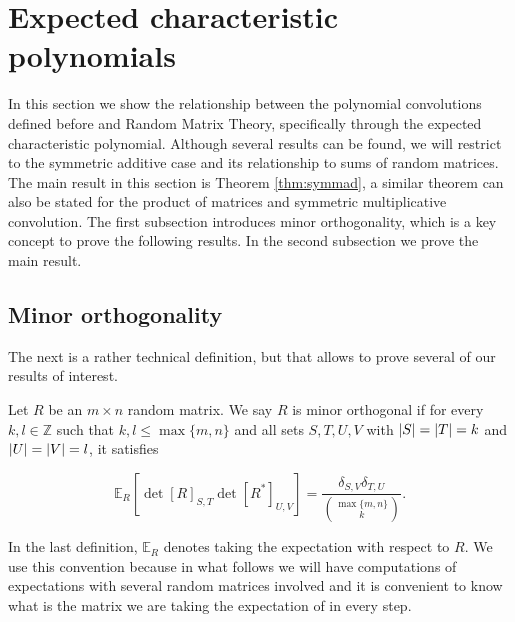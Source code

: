 

\section{Expected characteristic polynomials} \label{sec:minor_orthogonality}

In this section we show the relationship between the polynomial convolutions defined before and Random Matrix Theory, specifically through the expected characteristic polynomial. Although several results can be found, we will restrict to the symmetric additive case and its relationship to sums of random matrices. The main result in this section is Theorem \ref{thm:symmad}, a similar theorem can also be stated for the product of matrices and symmetric multiplicative convolution. The first subsection introduces minor orthogonality, which is a key concept to prove the following results. In the second subsection we prove the main result.

\subsection{Minor orthogonality}

The next is a rather technical definition, but that allows to prove several of our results of interest.

\begin{definition}
    Let $R$ be an $m \times n$ random matrix. We say $R$ is minor orthogonal if for every $k,l \in \mathbb Z$ such that $k,l \le \max\{m,n\}$ and all sets $S,T,U,V$ with $\lvert S \rvert = \lvert T \rvert = k$ and $\lvert U \rvert = \lvert V \rvert = l$, it satisfies
    
    \begin{equation*}
        \mathbb E_R\left[ \det[R]_{S,T} \det[R^*]_{U,V} \right] = \frac{\delta_{S,V}\delta_{T,U}}{\binom{\max\{m,n\}}{k}}.
    \end{equation*}
\end{definition}

    In the last definition, $\mathbb E_R$ denotes taking the expectation with respect to $R$. We use this convention because in what follows we will have computations of expectations with several random matrices involved and it is convenient to know what is the matrix we are taking the expectation of in every step.

